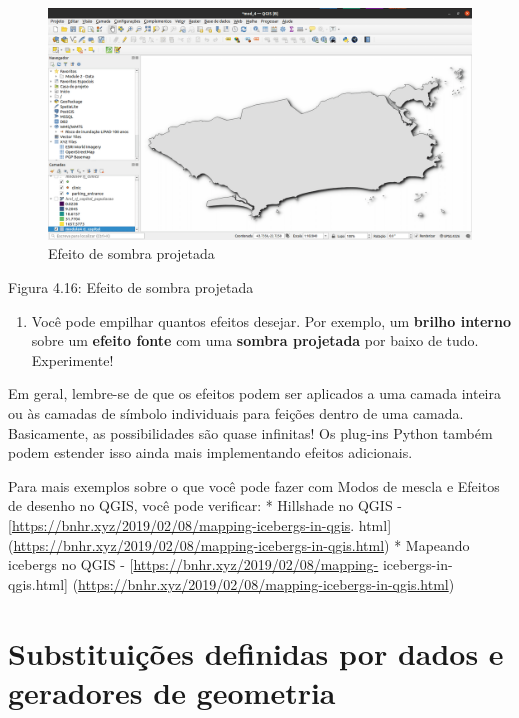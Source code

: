 \documentclass[
]{krantz}
\providecommand{\tightlist}{%
  \setlength{\itemsep}{0pt}\setlength{\parskip}{0pt}}
\begin{document}
\begin{figure}
\centering
\includegraphics{media/modulo4/drop-shadow-result.png}
\caption{Efeito de sombra projetada}
\end{figure}

Figura 4.16: Efeito de sombra projetada

\begin{enumerate}
\def\labelenumi{\arabic{enumi}.}
\setcounter{enumi}{7}
\tightlist
\item
  Você pode empilhar quantos efeitos desejar. Por exemplo, um \textbf{brilho interno} sobre um \textbf{efeito fonte} com uma \textbf{sombra projetada} por baixo de tudo. Experimente!
\end{enumerate}

Em geral, lembre-se de que os efeitos podem ser aplicados a uma camada inteira ou às camadas de símbolo individuais para feições dentro de uma camada. Basicamente, as possibilidades são quase infinitas! Os plug-ins Python também podem estender isso ainda mais implementando efeitos adicionais.

Para mais exemplos sobre o que você pode fazer com Modos de mescla e Efeitos de desenho no QGIS, você pode verificar:
* Hillshade no QGIS - {[}\url{https://bnhr.xyz/2019/02/08/mapping-icebergs-in-qgis}. html{]} (\url{https://bnhr.xyz/2019/02/08/mapping-icebergs-in-qgis.html})
* Mapeando icebergs no QGIS - {[}\url{https://bnhr.xyz/2019/02/08/mapping-} icebergs-in-qgis.html{]} (\url{https://bnhr.xyz/2019/02/08/mapping-icebergs-in-qgis.html})

\hypertarget{substituiuxe7uxf5es-definidas-por-dados-e-geradores-de-geometria}{%
\section{Substituições definidas por dados e geradores de geometria}\label{substituiuxe7uxf5es-definidas-por-dados-e-geradores-de-geometria}}
\end{document}
